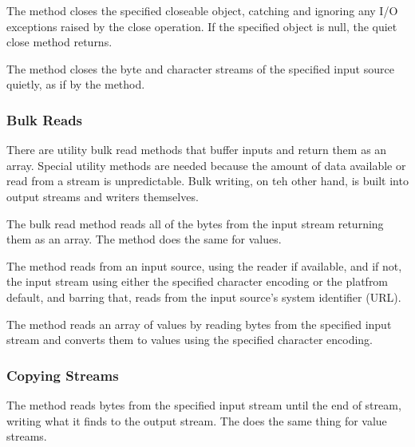 The method  closes the specified
closeable object, catching and ignoring any I/O exceptions raised
by the close operation.  If the specified object is null, the
quiet close method returns.

The method  closes the byte
and character streams of the specified input source quietly, as
if by the  method.

\subsubsection{Bulk Reads}

There are utility bulk read methods that buffer inputs and return them
as an array.  Special utility methods are needed because the amount of
data available or read from a stream is unpredictable.  Bulk writing,
on teh other hand, is built into output streams and writers
themselves.

The bulk read method  reads all of the
bytes from the input stream returning them as an array.  The method
 does the same for  values.

The method  reads from an input source,
using the reader if available, and if not, the input stream using
either the specified character encoding or the platfrom default, and
barring that, reads from the input source's system identifier (URL).

The method  reads an array of
 values by reading bytes from the specified input stream
and converts them to  values using the specified character
encoding. 

\subsubsection{Copying Streams}

The method  reads bytes from the
specified input stream until the end of stream, writing what it finds
to the output stream.  The  does the same
thing for  value streams.
